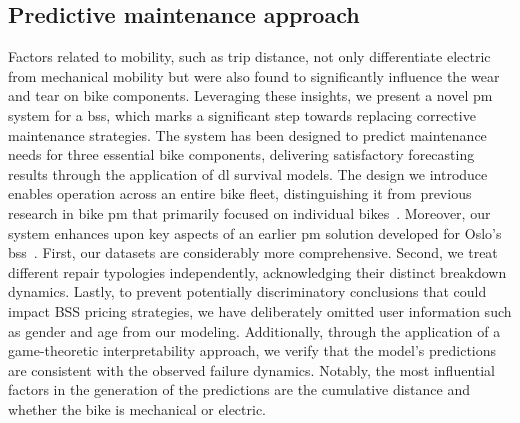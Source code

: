 \subsection{Predictive maintenance approach}

Factors related to mobility, such as trip distance, not only differentiate electric from mechanical mobility but were also found to significantly influence the wear and tear on bike components. Leveraging these insights, we present a novel \ac{pm} system for a \ac{bss}, which marks a significant step towards replacing corrective maintenance strategies. The system has been designed to predict maintenance needs for three essential bike components, delivering satisfactory forecasting results through the application of \ac{dl} survival models. The design we introduce enables operation across an entire bike fleet, distinguishing it from previous research in bike \ac{pm} that primarily focused on individual bikes~\cite{MountainBike2019, Matkovic2021}. Moreover, our system enhances upon key aspects of an earlier \ac{pm} solution developed for Oslo's \ac{bss}~\cite{Predictivemaintenancebike2018}. First, our datasets are considerably more comprehensive. Second, we treat different repair typologies independently, acknowledging their distinct breakdown dynamics.  Lastly, to prevent potentially discriminatory conclusions that could impact BSS pricing strategies, we have deliberately omitted user information such as gender and age from our modeling. Additionally, through the application of a game-theoretic interpretability approach, we verify that the model's predictions are consistent with the observed failure dynamics. Notably, the most influential factors in the generation of the predictions are the cumulative distance and whether the bike is mechanical or electric.

